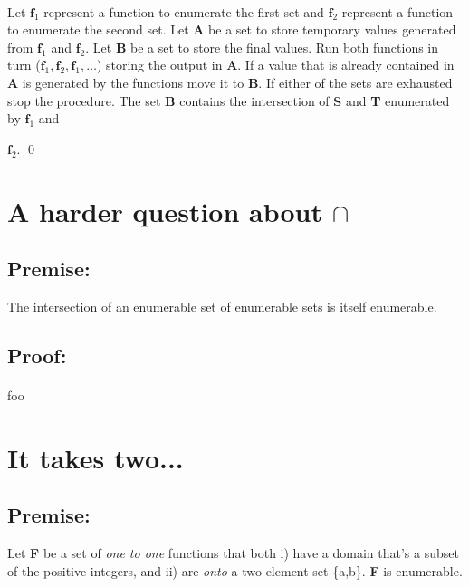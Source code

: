 \documentclass[a4paper,11pt]{article}
\begin{document}
		\paragraph{}
		Let $\textbf{f}_{1}$ represent a function to enumerate the first set and $\textbf{f}_{2}$ represent
		a function to enumerate the second set. Let \textbf{A} be a set to store temporary values generated 			from $\textbf{f}_{1}$ and $\textbf{f}_{2}$. Let \textbf{B} be a set to store the final values. Run both 			functions in turn ($\textbf{f}_{1},\textbf{f}_{2},\textbf{f}_{1},\dots$) storing the output in \textbf{A}. 
		If a value that is already contained in \textbf{A} is generated by the functions move it to \textbf{B}.
		If either of the sets are exhausted stop the procedure. The set \textbf{B} contains the 
		intersection of \textbf{S} and \textbf{T} enumerated by $\textbf{f}_{1}$ and {$\textbf{f}_{2}$. \qed
		


\section{A harder question about $\cap$}

	\subsection*{Premise:}
	The intersection of an enumerable set of enumerable sets is itself enumerable.

	\subsection*{Proof:}
		\paragraph{}
		foo


\section{It takes two...}

	\subsection*{Premise:}
	Let \textbf{F} be a set of \textit{one to one} functions that both i) have a domain that's a subset of the positive
	integers, and ii) are \textit{onto} a two element set \{a,b\}. \textbf{F} is enumerable.

}
\end{document}

